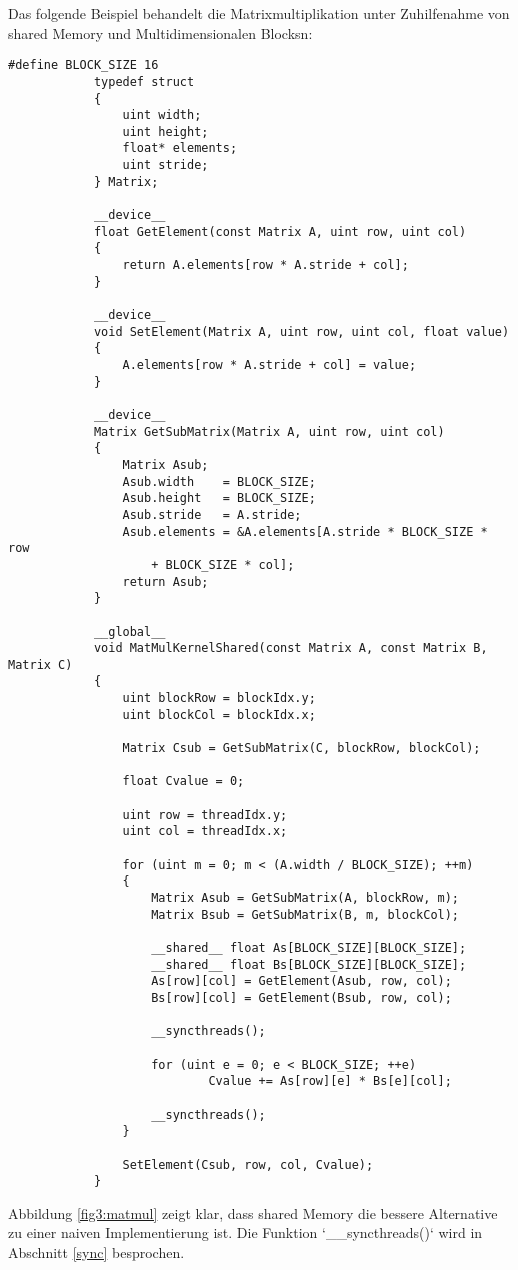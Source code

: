         Das folgende Beispiel behandelt die Matrixmultiplikation unter Zuhilfenahme von \gls{shared Memory} und Multidimensionalen \Glspl{Block}n:       
        \begin{lstlisting}[caption=~Matrixmultiplikation]
			#define BLOCK_SIZE 16 	
			typedef struct
			{
				uint width;
				uint height;
				float* elements;
				uint stride;
			} Matrix;

			__device__ 
			float GetElement(const Matrix A, uint row, uint col)
			{
				return A.elements[row * A.stride + col];
			}

			__device__ 
			void SetElement(Matrix A, uint row, uint col, float value)
			{
				A.elements[row * A.stride + col] = value;
			}
			
			__device__
			Matrix GetSubMatrix(Matrix A, uint row, uint col) 
			{
				Matrix Asub;
				Asub.width    = BLOCK_SIZE;
				Asub.height   = BLOCK_SIZE;
				Asub.stride   = A.stride;
				Asub.elements = &A.elements[A.stride * BLOCK_SIZE * row 
					+ BLOCK_SIZE * col];
				return Asub;
			}	
			 
			__global__ 
			void MatMulKernelShared(const Matrix A, const Matrix B, Matrix C)
			{    
    			uint blockRow = blockIdx.y;
    			uint blockCol = blockIdx.x;

    			Matrix Csub = GetSubMatrix(C, blockRow, blockCol);
    
    			float Cvalue = 0;

    			uint row = threadIdx.y;
    			uint col = threadIdx.x;

    			for (uint m = 0; m < (A.width / BLOCK_SIZE); ++m)
    			{
					Matrix Asub = GetSubMatrix(A, blockRow, m);
					Matrix Bsub = GetSubMatrix(B, m, blockCol);

					__shared__ float As[BLOCK_SIZE][BLOCK_SIZE];
					__shared__ float Bs[BLOCK_SIZE][BLOCK_SIZE];
					As[row][col] = GetElement(Asub, row, col);
					Bs[row][col] = GetElement(Bsub, row, col);

					__syncthreads();

					for (uint e = 0; e < BLOCK_SIZE; ++e)
							Cvalue += As[row][e] * Bs[e][col];

					__syncthreads();
				}

				SetElement(Csub, row, col, Cvalue);
			}
        \end{lstlisting}
        
        Abbildung \ref{fig3:matmul} zeigt klar, dass \gls{shared Memory} die bessere Alternative zu einer naiven Implementierung ist. Die Funktion \li`__syncthreads()` wird in Abschnitt \ref{sync} besprochen.
        
